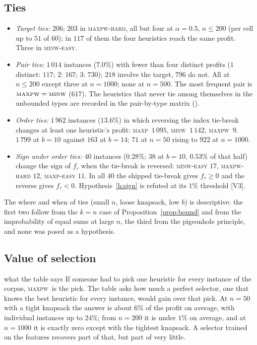 \documentclass[a4paper,11pt]{article}
\newcommand{\code}[1]{\path{#1}}
\newcommand{\MAXP}{\textsc{maxp}}
\newcommand{\MAXPW}{\textsc{maxpw}}
\newcommand{\MINW}{\textsc{minw}}
\newcommand{\evid}[1]{\textcolor{inkSoft}{\scriptsize[#1]}}
\theoremstyle{plain}
\theoremstyle{definition}
\theoremstyle{remark}
\begin{document}
\subsection{Ties}\label{sec:ties-results}

\begin{itemize}[leftmargin=1.6em,itemsep=2pt]
\item \emph{Target ties:} $206$; $203$ in \MAXPW-\textsc{hard}, all but four at $\alpha=0.5$,
$n\le200$ (per cell up to $51$ of $60$); in $117$ of them the four heuristics reach the
same profit. Three in \MINW-\textsc{easy}.
\item \emph{Pair ties:} $1\,014$ instances ($7.0\%$) with fewer than four distinct profits
($1$ distinct: $117$; $2$: $167$; $3$: $730$); $218$ involve the target, $796$ do not. All
at $n\le200$ except three at $n=1000$; none at $n=500$. The most frequent pair is
$\MAXPW=\MINW$ ($617$). The heuristics that never tie among themselves in the unbounded
types are recorded in the pair-by-type matrix (\code{ties_all.png}).
\item \emph{Order ties:} $1\,962$ instances ($13.6\%$) in which reversing the index tie-break
changes at least one heuristic's profit: \MAXP\ $1\,095$, \MINW\ $1\,142$, \MAXPW\ $9$.
$1\,799$ at $b=10$ against $163$ at $b=14$; $71$ at $n=50$ rising to $922$ at $n=1000$.
\item \emph{Sign under order ties:} $40$ instances ($0.28\%$; $38$ at $b=10$, $0.53\%$ of
that half) change the sign of $f_\tau$ when the tie-break is reversed: \MINW-\textsc{easy}
$17$, \MAXPW-\textsc{hard} $12$, \MAXP-\textsc{easy} $11$. In all $40$ the shipped
tie-break gives $f_\tau\ge0$ and the reverse gives $f_\tau<0$. Hypothesis~\ref{h:sign} is
refuted at its $1\%$ threshold \evid{V3}.
\end{itemize}
The where and when of ties (small $n$, loose knapsack, low $b$) is descriptive: the first
two follow from the $k=n$ case of Proposition~\ref{prop:bound} and from the improbability of
equal sums at large $n$, the third from the pigeonhole principle, and none was posed as a
hypothesis.

\subsection{Value of selection}\label{sec:selection}

\begin{plain}{what the table says}
If someone had to pick one heuristic for every instance of the corpus, \MAXPW\ is the
pick. The table asks how much a perfect selector, one that knows the best heuristic for
every instance, would gain over that pick. At $n=50$ with a tight knapsack the answer is
about $6\%$ of the profit on average, with individual instances up to $24\%$; from $n=200$ it
is under $1\%$ on average, and at $n=1000$ it is exactly zero except with the tightest
knapsack. A selector trained on the features recovers part of that, but part of very little.
\end{plain}
\end{document}
